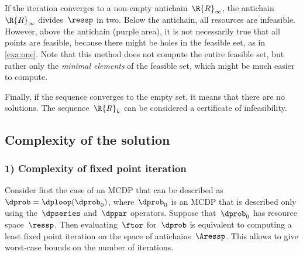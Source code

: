 If the iteration converges to a non-empty antichain~$\R{R}_{\infty}$,
the antichain~$\R{R}_{\infty}$ divides~$\ressp$ in two. Below
the antichain, all resources are infeasible. However, above the antichain
(purple area), it is not necessarily true that all points are feasible,
because there might be holes in the feasible set, as in \cref{exa:one}.
Note that this method does not compute the entire feasible set, but
rather only the \emph{minimal elements} of the feasible set, which
might be much easier to compute.

Finally, if the sequence converges to the empty set, it means that
there are no solutions. The sequence~$\R{R}_{k}$ can be considered
a certificate of infeasibility.

\subsection{Complexity of the solution }


\subsubsection{1) Complexity of fixed point iteration}

Consider first the case of an MCDP that can be described as~$\dprob=\dploop(\dprob_{0})$,
where~$\dprob_{0}$ is an MCDP that is described only using the~$\dpseries$
and~$\dppar$ operators. Suppose that~$\dprob_{0}$ has resource
space~$\ressp$. Then evaluating~$\ftor$ for~$\dprob$ is equivalent
to computing a least fixed point iteration on the space of antichains~$\Aressp$.
This allows to give worst-case bounds on the number of iterations.

